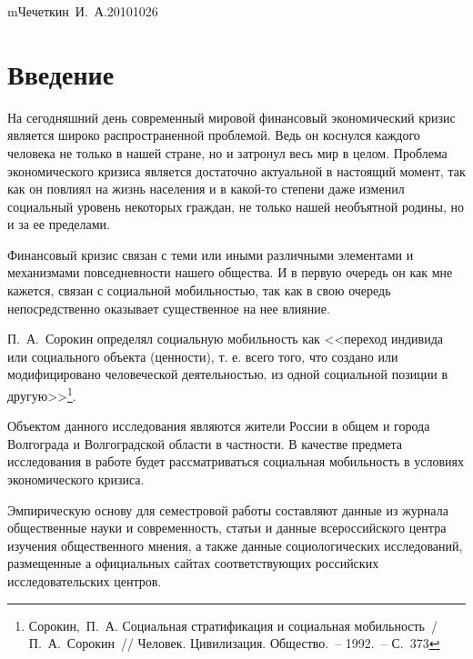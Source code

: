 


    {m}{Чечеткин~И.~А.}{20101026}
  \onehalfspacing
  \setcounter{page}{2}
  \tableofcontents

  \newpage

  \section*{Введение}
  На сегодняшний день современный мировой финансовый экономический кризис
  является широко распространенной проблемой. Ведь он коснулся каждого человека
  не только в нашей стране, но и затронул весь мир в целом. Проблема
  экономического кризиса является достаточно актуальной в настоящий момент, так
  как он повлиял на жизнь населения и в какой-то степени даже изменил социальный
  уровень некоторых граждан, не только нашей необъятной родины, но и за ее
  пределами.

  Финансовый кризис связан с теми или иными различными элементами и механизмами
  повседневности нашего общества. И в первую очередь он как мне кажется, связан
  с социальной мобильностью, так как в свою очередь непосредственно оказывает
  существенное на нее влияние.

  П.~А.~Сорокин определял социальную мобильность как << переход
  индивида или социального объекта (ценности), т. е. всего того, что создано или
  модифицировано человеческой деятельностью, из одной социальной позиции в
  другую>>\footnote{Сорокин,~П.~А. Социальная стратификация и социальная
  мобильность~/ П.~А.~Сорокин~// Человек. Цивилизация. Общество.~-- 1992.~--
  С.~373}.

  Объектом данного исследования являются жители России в общем и города
  Волгограда и Волгоградской области в частности. В качестве предмета
  исследования в работе будет рассматриваться социальная мобильность в условиях
  экономического кризиса.

  Эмпирическую основу для семестровой работы составляют данные из журнала
  общественные науки и современность, статьи и данные всероссийского центра
  изучения общественного мнения, а также данные социологических исследований,
  размещенные а официальных сайтах соответствующих российских исследовательских
  центров.

